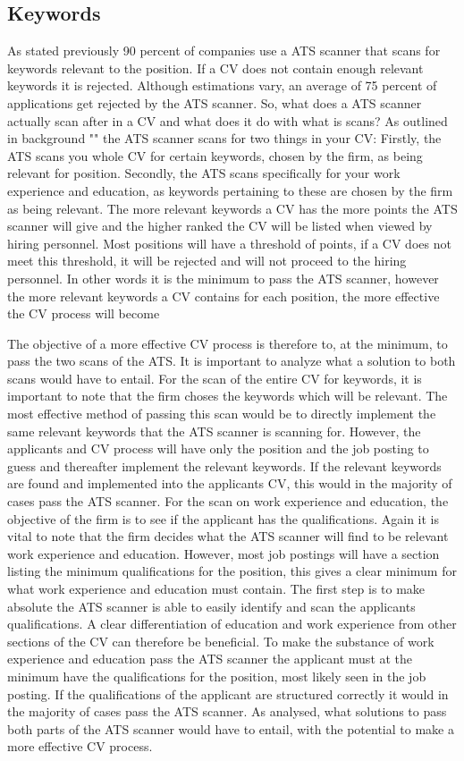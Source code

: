 \subsection{Keywords}
As stated previously 90 percent of companies use a ATS scanner that scans for keywords relevant to the position.
If a CV does not contain enough relevant keywords it is rejected. 
Although estimations vary, an average of 75 percent of applications get rejected by the ATS scanner.
So, what does a ATS scanner actually scan after in a CV and what does it do with what is scans?
As outlined in background "" the ATS scanner scans for two things in your CV:
Firstly, the ATS scans you whole CV for certain keywords, chosen by the firm, as being relevant for position.
Secondly, the ATS scans specifically for your work experience and education, as keywords pertaining to these are chosen by the firm as being relevant. 
The more relevant keywords a CV has the more points the ATS scanner will give and the higher ranked the CV will be listed when viewed by hiring personnel.
Most positions will have a threshold of points, if a CV does not meet this threshold, it will be rejected and will not proceed to the hiring personnel.
In other words it is the minimum to pass the ATS scanner, however the more relevant keywords a CV contains for each position, the more effective the CV process will become

The objective of a more effective CV process is therefore to, at the minimum, to pass the two scans of the ATS.
It is important to analyze what a solution to both scans would have to entail.
For the scan of the entire CV for keywords, it is important to note that the firm choses the keywords which will be relevant.
The most effective method of passing this scan would be to directly implement the same relevant keywords that the ATS scanner is scanning for.
However, the applicants and CV process will have only the position and the job posting to guess and thereafter implement the relevant keywords.
If the relevant keywords are found and implemented into the applicants CV, this would in the majority of cases pass the ATS scanner.
For the scan on work experience and education, the objective of the firm is to see if the applicant has the qualifications.
Again it is vital to note that the firm decides what the ATS scanner will find to be relevant work experience and education.
However, most job postings will have a section listing the minimum qualifications for the position, this gives a clear minimum for what work experience and education must contain.
The first step is to make absolute the ATS scanner is able to easily identify and scan the applicants qualifications.
A clear differentiation of education and work experience from other sections of the CV can therefore be beneficial.
To make the substance of work experience and education pass the ATS scanner the applicant must at the minimum have the qualifications for the position, most likely seen in the job posting.
If the qualifications of the applicant are structured correctly it would in the majority of cases pass the ATS scanner.
As analysed, what solutions to pass both parts of the ATS scanner would have to entail, with the potential to make a more effective CV process.


